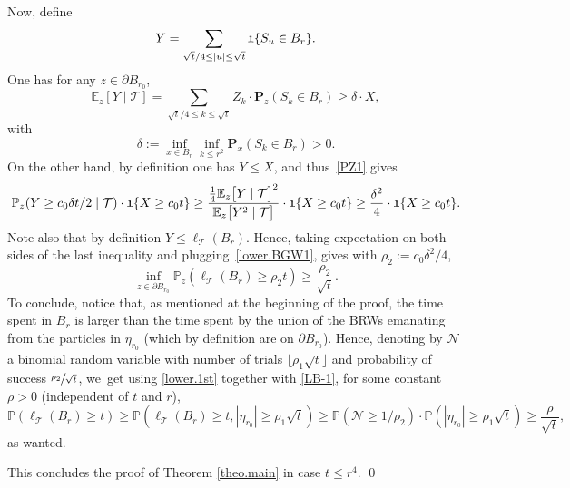 \documentclass[11pt]{article}
\numberwithin{equation}{section}
\theoremstyle{plain}
\theoremstyle{definition}
\newcommand{\1}{{\text{\Large $\mathfrak 1$}}}
\begin{document}
Now, define
\begin{equation*}%
Y= \sum_{\sqrt t/4\le |u|\le \sqrt t} \1\{S_u \in B_r\}.
\end{equation*}
One has for any $z\in \partial B_{r_0}$,
\[
\mathbb E_z[Y\mid \mathbf {\mathcal T}] =
\sum_{\sqrt t/4\le k\le\sqrt t} Z_k \cdot \mathbf P_z(S_k \in B_r)
\ge \delta\cdot X,
\]
with
\begin{equation*}
\delta:=\inf_{x\in B_r}\inf_{k\le r^2} \mathbf P_x(S_k\in B_r)>0.
\end{equation*}
On the other hand, by definition one has
$Y \le X$, and thus~\eqref{PZ1}
gives
\[
\mathbb P_z(Y \ge c_0\delta t/2 \mid \mathbf {\mathcal T})
\cdot \1\{X\ge c_0t\}
\ge \frac{\frac{1}{4}\mathbb E_z\big[ Y\mid \mathbf {\mathcal T}\big]^2}
{\mathbb E_z\big[Y^2\mid \mathbf {\mathcal T}\big]}\cdot \1\{X\ge c_0t \}
\ge \frac{\delta^2}{4}\cdot \1\{X\ge c_0t\}.
\]
Note also that by definition $Y\le \ell_{\mathcal T}(B_r)$. Hence, taking expectation on
both sides of the last inequality and plugging~\eqref{lower.BGW1}, gives with $\rho_2:= c_0\delta^2/4$,
\begin{equation}\label{LB-1}
\inf_{z\in \partial B_{r_0}} \mathbb P_z(\ell_{\mathcal T}(B_r)\ge \rho_2 t) \ge \frac{\rho_2}{\sqrt t}.
\end{equation}
To conclude, notice that, as mentioned at the beginning of the proof, the time spent in $B_r$ is larger than the time spent by
the union of the BRWs emanating from the particles in $\eta_{r_0}$ (which by definition are on $\partial B_{r_0}$).
Hence, denoting by $\mathcal N$ a binomial random variable with number of trials $\lfloor \rho_1\sqrt t\rfloor $ and probability of success $\sfrac{\rho_2}{\sqrt t}$, we~get using \eqref{lower.1st} together with \eqref{LB-1},
for some constant $\rho>0$ (independent of $t$ and $r$),
\[
\mathbb P(\ell_{\mathcal T}(B_r) \ge t) \ge\mathbb P(\ell_{\mathcal T}(B_r) \ge t, |\eta_{r_0}|\ge \rho_1\sqrt t) \ge \mathbb P(\mathcal N\ge 1/\rho_2)\cdot \mathbb P(|\eta_{r_0}|\ge \rho_1\sqrt t) \ge \frac{\rho}{\sqrt t},
\]
as wanted.

This concludes the proof of Theorem \ref{theo.main} in case $t\le r^4$. \qed
\end{document}
